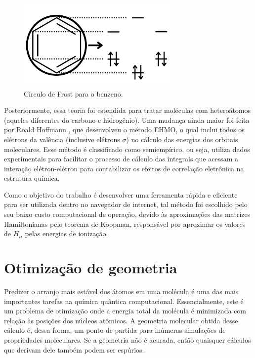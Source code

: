 \begin{figure}[htb]
	\caption{\label{fig:M1} Círculo de Frost para o benzeno.}
	\begin{center}
		\includegraphics[width=0.70\textwidth]{images/figM.png}
	\end{center}
\end{figure}


Posteriormente, essa teoria foi estendida para tratar moléculas com heteroátomos (aqueles diferentes do carbono e hidrogênio)\autocite{Liwschitz1963}. Uma mudança ainda maior foi feita por Roald Hoffmann \autocite{Hoffmann1963}, que desenvolveu o método \gls{EHMO}, o qual inclui todos os elétrons da valência (inclusive elétrons $\sigma$) no cálculo das energias dos orbitais moleculares. Esse método é classificado como semiempírico, ou seja, utiliza dados experimentais para facilitar o processo de cálculo das integrais que acessam a interação elétron-elétron para contabilizar os efeitos de correlação eletrônica na estrutura química.

Como o objetivo do trabalho é desenvolver uma ferramenta rápida e eficiente para ser utilizada dentro no navegador de internet, tal método foi escolhido pelo seu baixo custo computacional de operação, devido às aproximações das matrizes Hamiltonianas pelo teorema de Koopman, responsável por aproximar os valores de $H_{ii}$ pelas energias de ionização. 

\section{Otimização de geometria}

Predizer o arranjo mais estável dos átomos em uma molécula é uma das mais importantes tarefas na química quântica computacional. Essencialmente, este é um problema de otimização onde a energia total da molécula é minimizada com relação às posições dos núcleos atômicos. A geometria molecular obtida desse cálculo é, dessa forma, um ponto de partida para inúmeras simulações de propriedades moleculares. Se a geometria não é acurada, então quaisquer cálculos que derivam dele também podem ser espúrios.

